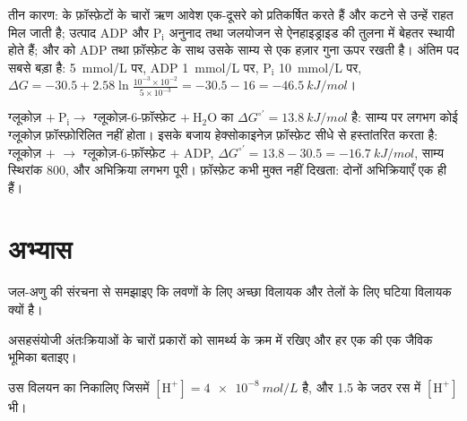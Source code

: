 \begin{example}\label{ex:b1:water-small-molecules:whyatp}
तीन कारण:  के फ़ॉस्फ़ेटों के चारों ऋण आवेश एक-दूसरे को प्रतिकर्षित
करते हैं और कटने से उन्हें राहत मिल जाती है; उत्पाद $\mathrm{ADP}$ और
$\mathrm{P_i}$ अनुनाद तथा जलयोजन से ऐनहाइड्राइड की तुलना में बेहतर
स्थायी होते हैं; और   को ADP तथा फ़ॉस्फ़ेट के साथ उसके साम्य से
एक हज़ार गुना ऊपर रखती है। अंतिम पद सबसे बड़ा है:  \qty{5}{mmol/L}
पर, ADP \qty{1}{mmol/L} पर, $\mathrm{P_i}$
\qty{10}{mmol/L} पर,
$\Delta G = -30.5 + 2.58\ln\frac{10^{-3}\times 10^{-2}}{5\times 10^{-3}}
= -30.5 - 16 = \qty{-46.5}{kJ/mol}$।
\end{example}

\begin{example}[युग्मन]\label{ex:b1:water-small-molecules:coupling}
ग्लूकोज़ $+\ \mathrm{P_i} \to$ ग्लूकोज़-6-फ़ॉस्फ़ेट $+\ \mathrm{H_2O}$
का $\Delta G^{\circ\prime} = \qty{+13.8}{kJ/mol}$ है: साम्य पर लगभग
कोई ग्लूकोज़ फ़ॉस्फ़ोरिलित नहीं होता। इसके बजाय हेक्सोकाइनेज़
फ़ॉस्फ़ेट सीधे  से हस्तांतरित करता है: ग्लूकोज़ $+$  $\to$
ग्लूकोज़-6-फ़ॉस्फ़ेट $+$ ADP, $\Delta G^{\circ\prime} = 13.8 - 30.5 =
\qty{-16.7}{kJ/mol}$, साम्य स्थिरांक $800$, और अभिक्रिया लगभग पूरी।
फ़ॉस्फ़ेट कभी मुक्त नहीं दिखता: दोनों अभिक्रियाएँ एक ही हैं।
\end{example}

\section{अभ्यास}

\begin{exercise}[$\star$]\label{exo:b1:water-small-molecules:1}
जल-अणु की संरचना से समझाइए कि  लवणों के लिए अच्छा विलायक और तेलों के
लिए घटिया विलायक क्यों है।
\end{exercise}

\begin{exercise}[$\star$]\label{exo:b1:water-small-molecules:2}
असहसंयोजी अंतःक्रियाओं के चारों प्रकारों को सामर्थ्य के क्रम में रखिए और
हर एक की एक जैविक भूमिका बताइए।
\end{exercise}

\begin{exercise}[$\star$]\label{exo:b1:water-small-molecules:3}
उस विलयन का  निकालिए जिसमें $[\mathrm{H^+}] = \qty{4e-8}{mol/L}$ है,
और  1.5 के जठर रस में $[\mathrm{H^+}]$ भी।
\end{exercise}


